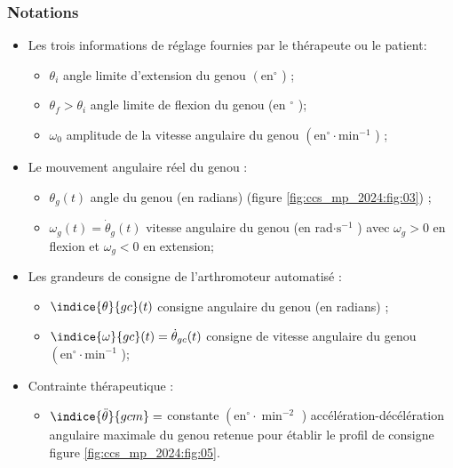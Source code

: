 \subsubsection*{Notations }
\begin{itemize}
  \item Les trois informations de réglage fournies par le thérapeute ou le patient:
\begin{itemize}
  \item $\theta_{i}$ angle limite d'extension du genou $\left(\mathrm{en}^{\circ}\right.$ ) ;

  \item $\theta_{f}>\theta_{i}$ angle limite de flexion du genou (en ${ }^{\circ}$ );

  \item $\omega_{0}$ amplitude de la vitesse angulaire du genou $\left(\mathrm{en}^{\circ} \cdot \mathrm{min}^{-1}\right.$ ) ;
  \end{itemize}

  \item Le mouvement angulaire réel du genou :
\begin{itemize}
  \item $\theta_{g}(t)$ angle du genou (en radians) (figure \ref{fig:ccs_mp_2024:fig:03}) ;

  \item $\omega_{g}(t)=\dot{\theta}_{g}(t)$ vitesse angulaire du genou (en rad$\cdot \mathrm{s}^{-1}$ ) avec $\omega_{g}>0$ en flexion et $\omega_{g}<0$ en extension;
  \end{itemize}
  \item Les grandeurs de consigne de l'arthromoteur automatisé :
\begin{itemize}
  \item $\indice{\theta}{g c}(t)$ consigne angulaire du genou (en radians) ;

  \item $\indice{\omega}{g c}(t)=\dot{\theta}_{g c}(t)$ consigne de vitesse angulaire du genou $\left(\mathrm{en}^{\circ} \cdot \mathrm{min}^{-1}\right.$ );
  \end{itemize}
  \item Contrainte thérapeutique :
\begin{itemize}
  \item $\indice{\ddot{\theta}}{g c m}=$ constante $\left(\mathrm{en}^{\circ} \cdot \min ^{-2}\right.$ ) accélération-décélération angulaire maximale du genou retenue pour établir le profil de consigne figure \ref{fig:ccs_mp_2024:fig:05}.
\end{itemize}
\end{itemize}

